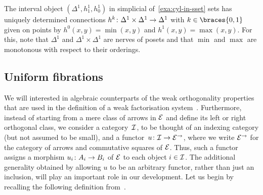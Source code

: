 \documentclass[reqno,10pt,a4paper,oneside]{amsart}
\begin{document}

\begin{example}
The interval object $(\Delta^1, h_1^1, h_0^1)$ in simplicial of~\cref{exa:cyl-in-sset} sets has uniquely determined connections $h^k \co \Delta^1 \times \Delta^1 \to \Delta^1$ with $k \in \braces{0, 1}$ given on points by $h^0(x, y) = \min(x, y)$ and $h^1(x, y) = \max(x, y)$.
For this, note that $\Delta^1$ and $\Delta^1 \times \Delta^1$ are nerves of posets and that $\min$ and $\max$ are monotonous with respect to their orderings.
\end{example}

\begin{example} 
\end{example}





\subsection*{Uniform fibrations}
We will interested in algebraic counterparts of the weak orthogonality properties that are used in the definition of a weak factorisation system~\cite{bousfield-wfs}.
Furthermore, instead of starting from a mere class of arrows in $\catE$ and define its left or right orthogonal class, we consider a category~$\cal{I}$, to be thought of an indexing category (but not assumed to be small), and a functor~$u \co \cal{I} \to \catE^\to$, where we write $\cal{E}^\to$ for the category of arrows and commutative squares of $\catE$.
Thus, such a functor assigns a morphism $u_i \co A_i \to B_i$ of $\catE$ to each object $i \in \cal{I}$.
The additional generality obtained by allowing $u$ to be an arbitrary functor, rather than just an inclusion, will play an important role in our development.
Let us begin by recalling the following definition from~\cite{garner:small-object-argument}.
\end{document}
